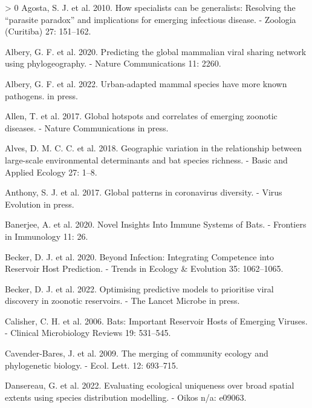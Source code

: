 \documentclass[11pt]{article}
\newlength{\cslhangindent}
\newenvironment{CSLReferences}[3] %
 {%
  \setlength{\parindent}{0pt}
  \ifodd #1 \everypar{\setlength{\hangindent}{\cslhangindent}}\ignorespaces\fi
  \ifnum #2 > 0
  \setlength{\parskip}{#2\baselineskip}
  \fi
 }%
 {}
\begin{document}
\hypertarget{refs}{}
\begin{CSLReferences}{1}{0}
\leavevmode\hypertarget{ref-Agosta2010HowSpe}{}%
Agosta, S. J. et al. 2010. How specialists can be generalists: Resolving
the {``parasite paradox''} and implications for emerging infectious
disease. - Zoologia (Curitiba) 27: 151--162.

\leavevmode\hypertarget{ref-Albery2020PreGlo}{}%
Albery, G. F. et al. 2020. Predicting the global mammalian viral sharing
network using phylogeography. - Nature Communications 11: 2260.

\leavevmode\hypertarget{ref-Albery2022UrbMam}{}%
Albery, G. F. et al. 2022. Urban-adapted mammal species have more known
pathogens. in press.

\leavevmode\hypertarget{ref-Allen2017GloHot}{}%
Allen, T. et al. 2017. Global hotspots and correlates of emerging
zoonotic diseases. - Nature Communications in press.

\leavevmode\hypertarget{ref-Alves2018GeoVar}{}%
Alves, D. M. C. C. et al. 2018. Geographic variation in the relationship
between large-scale environmental determinants and bat species richness.
- Basic and Applied Ecology 27: 1--8.

\leavevmode\hypertarget{ref-Anthony2017GloPat}{}%
Anthony, S. J. et al. 2017. Global patterns in coronavirus diversity. -
Virus Evolution in press.

\leavevmode\hypertarget{ref-Banerjee2020NovIns}{}%
Banerjee, A. et al. 2020. Novel Insights Into Immune Systems of Bats. -
Frontiers in Immunology 11: 26.

\leavevmode\hypertarget{ref-Becker2020InfInt}{}%
Becker, D. J. et al. 2020. Beyond Infection: Integrating Competence into
Reservoir Host Prediction. - Trends in Ecology \& Evolution 35:
1062--1065.

\leavevmode\hypertarget{ref-Becker2022OptPre}{}%
Becker, D. J. et al. 2022. Optimising predictive models to prioritise
viral discovery in zoonotic reservoirs. - The Lancet Microbe in press.

\leavevmode\hypertarget{ref-Calisher2006BatImp}{}%
Calisher, C. H. et al. 2006. Bats: Important Reservoir Hosts of Emerging
Viruses. - Clinical Microbiology Reviews 19: 531--545.

\leavevmode\hypertarget{ref-Cavender-Bares2009MerCom}{}%
Cavender-Bares, J. et al. 2009. The merging of community ecology and
phylogenetic biology. - Ecol. Lett. 12: 693--715.

\leavevmode\hypertarget{ref-Dansereau2022EvaEco}{}%
Dansereau, G. et al. 2022. Evaluating ecological uniqueness over broad
spatial extents using species distribution modelling. - Oikos n/a:
e09063.


\end{CSLReferences}
\end{document}
